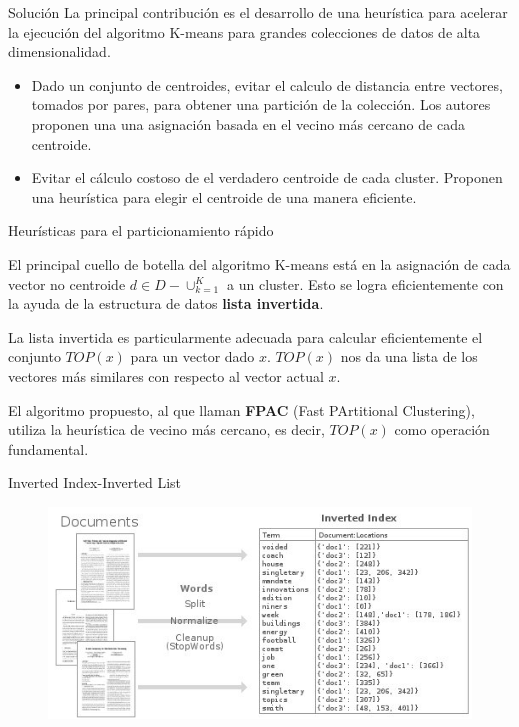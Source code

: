 \begin{frame}{Solución}
La principal contribución es el desarrollo de una
heurística para acelerar la ejecución del
algoritmo K-means para grandes colecciones de datos
de alta dimensionalidad.

\begin{itemize}
\item Dado un conjunto de centroides, evitar el calculo
de distancia entre vectores, tomados por pares, para obtener una 
partición de la colección. Los autores proponen una 
una asignación basada en el vecino más cercano de cada centroide.

\item Evitar el cálculo costoso de el verdadero centroide de 
cada cluster. Proponen una heurística para elegir el centroide
de una manera eficiente.
\end{itemize} 
\end{frame}

\begin{frame}{Heurísticas para el particionamiento rápido}

El principal cuello de botella del algoritmo K-means está
en la asignación de cada vector no centroide $d\in D - \cup_{k=1}^K$
a un cluster. Esto se logra eficientemente con la ayuda de la estructura
de datos \textbf{lista invertida}.

La lista invertida es particularmente adecuada para calcular
eficientemente el conjunto $TOP(x)$ para un vector dado $x$.
$TOP(x)$ nos da una lista de los vectores más similares
con respecto al vector actual $x$.

El algoritmo propuesto, al que llaman \textbf{FPAC} (Fast PArtitional
Clustering), utiliza la heurística de vecino más cercano, es decir,
$TOP(x)$ como operación fundamental.

\end{frame}


\begin{frame}{Inverted Index-Inverted List}
\begin{figure}
\includegraphics[scale=0.5]{img/invertedIndex}
\end{figure}
\end{frame}


